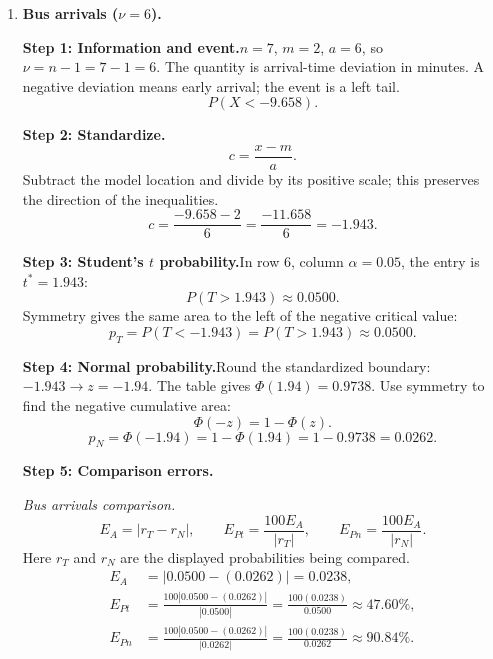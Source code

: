 \begin{enumerate}[leftmargin=*,label=\textbf{\arabic*.},itemsep=12pt,parsep=3pt,topsep=5pt]
\item \begin{minipage}[t]{\linewidth}\textbf{Bus arrivals ($\nu=6$).}\nopagebreak
\par\textbf{Step 1: Information and event.}\nopagebreak\enspace $n=7$, $m=2$, $a=6$, so $\nu=n-1=7-1=6$. The quantity is arrival-time deviation in minutes. A negative deviation means early arrival; the event is a left tail.\[
P(X<-9.658).
\]

\end{minipage}\par
\par\noindent\begin{minipage}{\linewidth}
\par\textbf{Step 2: Standardize.}\nopagebreak\enspace \[
c=\frac{x-m}{a}.
\]
Subtract the model location and divide by its positive scale; this preserves the direction of the inequalities.
\[
c=\frac{-9.658-2}{6}=\frac{-11.658}{6}=-1.943.
\]

\end{minipage}\par
\par\noindent\begin{minipage}{\linewidth}
\par\textbf{Step 3: Student's $t$ probability.}\nopagebreak\enspace In row $6$, column $\alpha=0.05$, the entry is $t^*=1.943$:
\[
P(T>1.943)\approx0.0500.
\]
Symmetry gives the same area to the left of the negative critical value:
\[
p_T=P(T<-1.943)=P(T>1.943)\approx\boxed{0.0500}.
\]

\end{minipage}\par
\par\textbf{Step 4: Normal probability.}\nopagebreak\enspace Round the standardized boundary: $-1.943\to z=-1.94$. The table gives $\Phi(1.94)=0.9738$. Use symmetry to find the negative cumulative area:
\[
\Phi(-z)=1-\Phi(z).
\]
\[
p_N=\Phi(-1.94)=1-\Phi(1.94)=1-0.9738=\boxed{0.0262}.
\]

\par\textbf{Step 5: Comparison errors.}\nopagebreak\enspace \par\noindent\begin{minipage}{\linewidth}
\par\textit{Bus arrivals comparison.}
\[
E_A=|r_T-r_N|,\qquad E_{Pt}=\frac{100E_A}{|r_T|},\qquad E_{Pn}=\frac{100E_A}{|r_N|}.
\]
Here $r_T$ and $r_N$ are the displayed probabilities being compared.
\[
\begin{aligned}
E_A&=|0.0500-(0.0262)|=0.0238,\\
E_{Pt}&=\frac{100|0.0500-(0.0262)|}{|0.0500|}=\frac{100(0.0238)}{0.0500}\approx 47.60\%,\\
E_{Pn}&=\frac{100|0.0500-(0.0262)|}{|0.0262|}=\frac{100(0.0238)}{0.0262}\approx 90.84\%.
\end{aligned}
\]
\end{minipage}\par


\end{enumerate}
